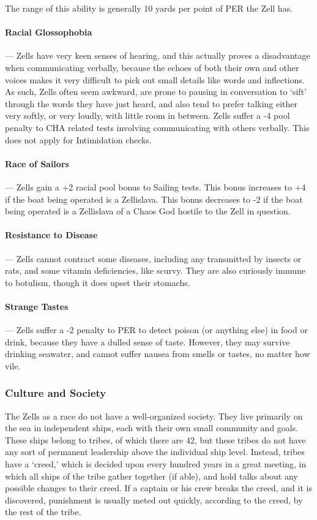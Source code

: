 \documentclass[oneside,11pt,english]{book}
\begin{document}
The range of this ability is generally 10 yards per point of PER the Zell has. 

\paragraph{Racial Glossophobia}---\quad
Zells have very keen senses of hearing, and this actually proves a disadvantage when 
communicating verbally, because the echoes of both their own and other voices makes it very 
difficult to pick out small details like words and inflections. As such, Zells often seem awkward, 
are prone to pausing in conversation to ‘sift’ through the words they have just heard, and also 
tend to prefer talking either very softly, or very loudly, with little room in between. Zells suffer a 
-4 pool penalty to CHA related tests involving communicating with others verbally. This does not 
apply for Intimidation checks. 

\paragraph{Race of Sailors}---\quad
Zells gain a +2 racial pool bonus to Sailing tests. This bonus increases to +4 if the boat being 
operated is a Zellislava. This bonus decreases to -2 if the boat being operated is a Zellislava of a 
Chaos God hostile to the Zell in question. 

\paragraph{Resistance to Disease}---\quad
Zells cannot contract some diseases, including any transmitted by insects or rats, and some 
vitamin deficiencies, like scurvy. They are also curiously immune to botulism, though it does 
upset their stomachs. 

\paragraph{Strange Tastes}---\quad
Zells suffer a -2 penalty to PER to detect poison (or anything else) in food or drink, because they 
have a dulled sense of taste. However, they may survive drinking seawater, and cannot suffer 
nausea from smells or tastes, no matter how vile. 

\subsubsection*{Culture and Society} 
The Zells as a race do not have a well-organized society. They live primarily on the sea in independent 
ships, each with their own small community and goals. These ships belong to tribes, of which there are 
42, but these tribes do not have any sort of permanent leadership above the individual ship level. Instead, 
tribes have a ‘creed,’ which is decided upon every hundred years in a great meeting, in which all ships of 
the tribe gather together (if able), and hold talks about any possible changes to their creed. If a captain or 
his crew breaks the creed, and it is discovered, punishment is usually meted out quickly, according to the 
creed, by the rest of the tribe. 
\end{document}
